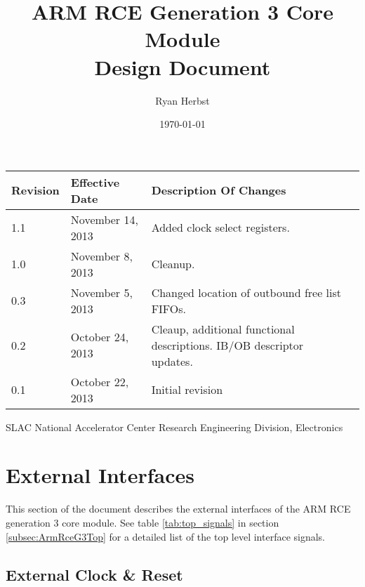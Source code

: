 \documentclass[11pt]{article}
\begin{document}
\thispagestyle{empty}

\title{ARM RCE Generation 3 Core Module \\ Design Document}
\author{Ryan Herbst}
\date{\today}

\maketitle
\begin{table}[H]
\centering
   \begin{tabular}{| l | l | l | l | } 
      \hline \textbf{Revision} & \textbf{Effective Date} & \textbf{Description Of Changes} \\
      \hline 1.1               & November 14, 2013       & Added clock select registers.  \\
      \hline 1.0               & November 8, 2013        & Cleanup.  \\
      \hline 0.3               & November 5, 2013        & Changed location of outbound free list FIFOs.  \\
      \hline 0.2               & October 24, 2013        & Cleaup, additional functional descriptions. IB/OB descriptor updates. \\
      \hline 0.1               & October 22, 2013        & Initial revision                \\
      \hline
   \end{tabular}
\end{table}

\vfill
\begin{center}
SLAC National Accelerator Center
Research Engineering Division, Electronics
\end{center}
\newpage
\tableofcontents

\newpage
\listoftables

\newpage
\listoffigures

\newpage
\section{External Interfaces}
\label{sec:external_interfaces}

This section of the document describes the external interfaces of the ARM RCE generation 3 core module. See
table \ref{tab:top_signals} in section \ref{subsec:ArmRceG3Top} for a detailed list of the top level interface signals.

\subsection{External Clock \& Reset}
\label{subsec:external_clock_reset}
\end{document}
